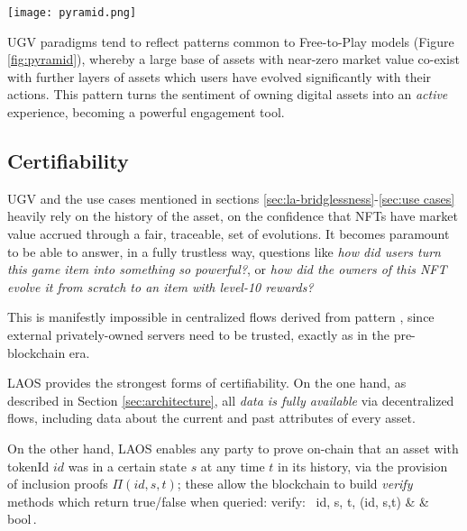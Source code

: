 \begin{Figure}
    \medskip
    \texttt{[image: pyramid.png]}
    \medskip
    \label{fig:pyramid}
\end{Figure}

UGV paradigms tend to reflect patterns common to Free-to-Play models
(Figure \ref{fig:pyramid}), whereby
a large base of assets with near-zero market value co-exist with further layers
of assets which users have evolved significantly with their actions. This pattern turns the 
sentiment of owning digital assets into an {\it active} experience, 
becoming a powerful engagement tool.


\subsection{Certifiability}\label{sec:ugv-certifiable}

UGV and the use cases mentioned in sections \ref{sec:la-bridglessness}-\ref{sec:use cases}
heavily rely on the history of the asset, on the confidence that NFTs have
market value accrued through a fair, traceable, set of evolutions.
It becomes paramount to be able to answer, in a fully trustless way, 
questions like {\it how did users turn this game item into something so powerful?}, or {\it how did
the owners of this NFT evolve it from scratch to an item with level-10 rewards?}

This is manifestly impossible in centralized flows derived from 
pattern , since external privately-owned servers need 
to be trusted, exactly as in the pre-blockchain era.

LAOS provides the strongest forms of certifiability. On the one hand,
as described in Section \ref{sec:architecture}, all {\it data is fully available}
via decentralized flows, including data about the current and
past attributes of every asset.

On the other hand, LAOS enables any party to prove on-chain that an asset
with tokenId $id$ was in a certain state $s$ at any time $t$ in its history,
via the provision
of inclusion proofs $\Pi(id, s,t)$; these allow the blockchain to build {\it verify} 
methods which return true/false when queried:
\bea
\mbox{verify: \espai} id, s, t, \Pi(id, s,t) & \rightarrow & \mbox{bool}\,.
\eea

